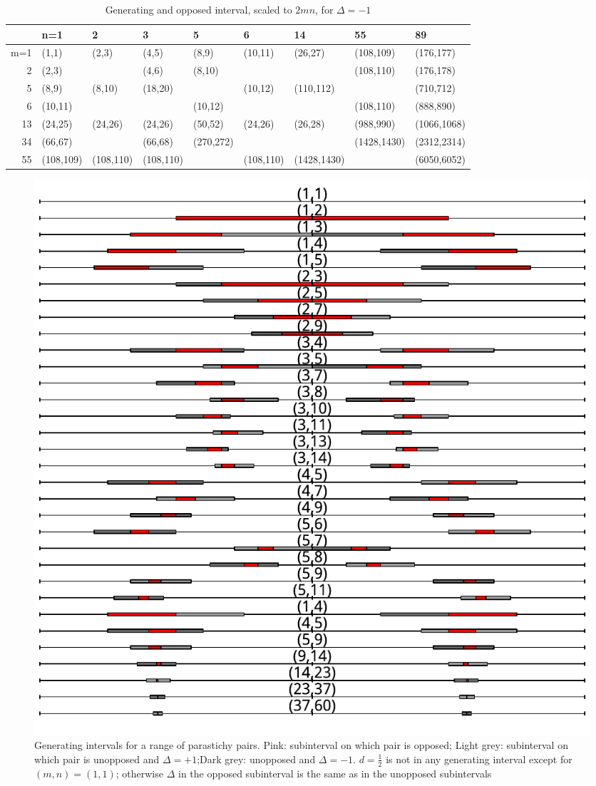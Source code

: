 \documentclass[a4paper]{article}
\newcommand{\half}{\textstyle{\frac{1}{2}}}
\newcommand{\jhalf}{\half}
\begin{document}
\begin{table}[ht]
\centering
\begin{tabular}{rllllllll}
  \hline
 & n=1 & 2 & 3 & 5 & 6 & 14 & 55 & 89 \\ 
  \hline
m=1 & (1,1) & (2,3) & (4,5) & (8,9) & (10,11) & (26,27) & (108,109) & (176,177) \\ 
  2 & (2,3) &  & (4,6) & (8,10) &  &  & (108,110) & (176,178) \\ 
  5 & (8,9) & (8,10) & (18,20) &  & (10,12) & (110,112) &  & (710,712) \\ 
  6 & (10,11) &  &  & (10,12) &  &  & (108,110) & (888,890) \\ 
  13 & (24,25) & (24,26) & (24,26) & (50,52) & (24,26) & (26,28) & (988,990) & (1066,1068) \\ 
  34 & (66,67) &  & (66,68) & (270,272) &  &  & (1428,1430) & (2312,2314) \\ 
  55 & (108,109) & (108,110) & (108,110) &  & (108,110) & (1428,1430) &  & (6050,6052) \\ 
   \hline
\end{tabular}
\caption{Generating and opposed interval, scaled to $2mn$, for $\Delta=-1$} 
\label{tab:genopintm}
\end{table}


\begin{center}
\begin{figure}[H]
\includegraphics{figdir/fig-gi}
\caption{Generating intervals for a range of parastichy pairs.  Pink: subinterval on which pair is opposed; Light grey: subinterval on which pair is unopposed and $\Delta=+1$;Dark grey: unopposed and $\Delta=-1$. $d=\jhalf$ is not in any generating interval except for $(m,n)=(1,1)$; otherwise $\Delta$ in the opposed subinterval is the same as in the unopposed subintervals}
\label{fig:ogi}
\end{figure}
\end{center}
\end{document}
